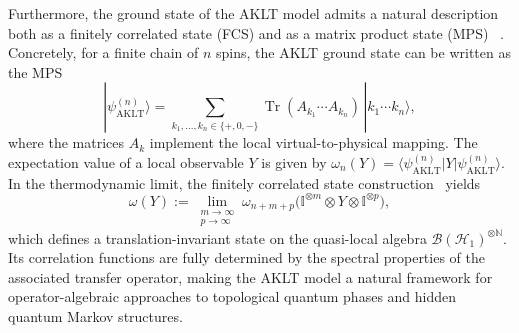 \documentclass[11pt,a4paper]{article}
\begin{document}
 Furthermore, the ground state of the AKLT model admits a natural description both as a finitely correlated state (FCS) and as a matrix product state (MPS) ~\cite{FNW92,CPSV21,SA26}.  Concretely, for a finite chain of $n$ spins, the AKLT ground state can be written as the MPS
\[
|\psi_{\mathrm{AKLT}}^{(n)}\rangle
= \sum_{k_1,\dots,k_n \in \{+,0,-\}}
\operatorname{Tr}(A_{k_1}\cdots A_{k_n}) \, |k_1\cdots k_n\rangle,
\]
where the matrices $A_k$ implement the local virtual-to-physical mapping. The expectation value of a local observable $Y$ is given by
\(
\omega_n(Y) = \langle \psi_{\mathrm{AKLT}}^{(n)} | Y | \psi_{\mathrm{AKLT}}^{(n)} \rangle.
\)
In the thermodynamic limit, the finitely correlated state construction~\cite{FNW92} yields
\[
\omega(Y) := \lim_{\substack{m\to\infty \\ p\to\infty}}
\omega_{n+m+p}\bigl(\mathbb{I}^{\otimes m} \otimes Y \otimes \mathbb{I}^{\otimes p}\bigr),
\]
which defines a translation-invariant state on the quasi-local algebra $\mathcal{B}(\mathcal{H}_1)^{\otimes\mathbb{N}}$. Its correlation functions are fully determined by the spectral properties of the associated transfer operator, making the AKLT model a natural framework for operator-algebraic approaches to topological quantum phases and hidden quantum Markov structures.
\end{document}
